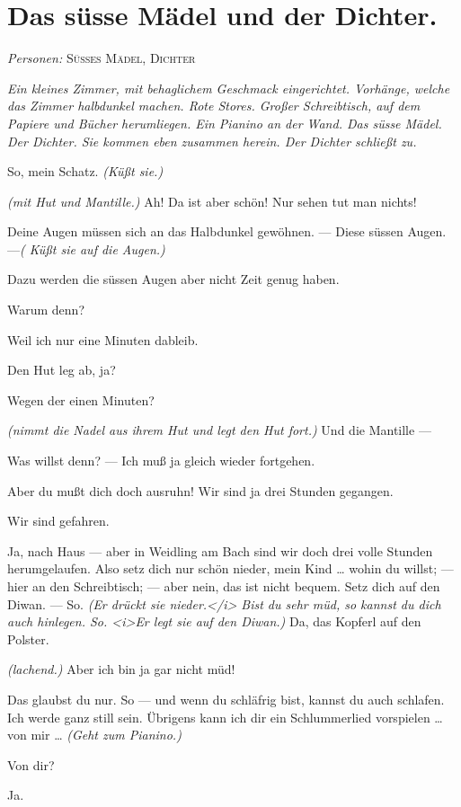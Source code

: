 \documentclass[
	final,
	a4paper,
	ngerman,
	mpinclude = true, %
	twoside = true,
	open = right,
	cleardoublepage = plain,
	DIV = 13,
	BCOR = 1cm,
	titlepage = firstiscover,
	]{scrbook}
\newcommand{\scene}{\section}
\newcommand{\direction}[1]{\textit{(#1)}}
\newcommand{\setting}[1]{\vspace{-0.5\baselineskip}\centering\textit{#1}}
\newcommand{\characterlist}[1]{{\begin{center}\textit{Personen:} #1\end{center}}}
\newcommand{\thecharacter}[1]{\textup{\textsc{#1}}\xspace}
\newcommand{\thesuesse}{\thecharacter{Süßes Mädel}}
\newcommand{\thedichter}{\thecharacter{Dichter}}
\newcommand{\character}[1]{\item[#1:]}
\newcommand{\suesse}{\character{\thesuesse}}
\newcommand{\dichter}{\character{\thedichter}}
\begin{document}
\scene{Das süsse Mädel und der Dichter.}
\characterlist{\thesuesse, \thedichter}
\setting{Ein kleines Zimmer, mit behaglichem Geschmack eingerichtet. Vorhänge, welche das Zimmer halbdunkel machen. Rote Stores. Großer Schreibtisch, auf dem Papiere und Bücher herumliegen. Ein Pianino an der Wand. Das süsse Mädel. Der Dichter. Sie kommen eben zusammen herein. Der Dichter schließt zu.}
\begin{play}
	\dichter
	So, mein Schatz. \direction{Küßt sie.}

	\suesse
	\direction{mit Hut und Mantille.} Ah! Da ist aber schön! Nur sehen tut man nichts!

	\dichter
	Deine Augen müssen sich an das Halbdunkel gewöhnen. --- Diese süssen Augen. ---\direction{ Küßt sie auf die Augen.}

	\suesse
	Dazu werden die süssen Augen aber nicht Zeit genug haben.

	\dichter
	Warum denn?

	\suesse
	Weil ich nur eine Minuten dableib.

	\dichter
	Den Hut leg ab, ja?

	\suesse
	Wegen der einen Minuten?

	\dichter
	\direction{nimmt die Nadel aus ihrem Hut und legt den Hut fort.} Und die Mantille ---

	\suesse
	Was willst denn? --- Ich muß ja gleich wieder fortgehen.

	\dichter
	Aber du mußt dich doch ausruhn! Wir sind ja drei Stunden gegangen.

	\suesse
	Wir sind gefahren.

	\dichter
	Ja, nach Haus --- aber in Weidling am Bach sind wir doch drei volle Stunden herumgelaufen. Also setz dich nur schön nieder, mein Kind \ldots{} wohin du willst; --- hier an den Schreibtisch; --- aber nein, das ist nicht bequem. Setz dich auf den Diwan. --- So. \direction{Er drückt sie nieder.</i> Bist du sehr müd, so kannst du dich auch hinlegen. So. <i>Er legt sie auf den Diwan.} Da, das Kopferl auf den Polster.

	\suesse
	\direction{lachend.} Aber ich bin ja gar nicht müd!

	\dichter
	Das glaubst du nur. So --- und wenn du schläfrig bist, kannst du auch schlafen. Ich werde ganz still sein. Übrigens kann ich dir ein Schlummerlied vorspielen \ldots{} von mir \ldots{} \direction{Geht zum Pianino.}

	\suesse
	Von dir?

	\dichter
	Ja.


\end{play}
\end{document}
